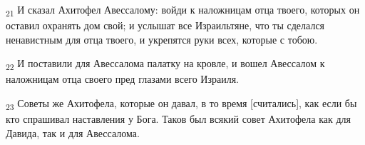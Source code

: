 \begin{tcolorbox}
\textsubscript{21} И сказал Ахитофел Авессалому: войди к наложницам отца твоего, которых он оставил охранять дом свой; и услышат все Израильтяне, что ты сделался ненавистным для отца твоего, и укрепятся руки всех, которые с тобою.
\end{tcolorbox}
\begin{tcolorbox}
\textsubscript{22} И поставили для Авессалома палатку на кровле, и вошел Авессалом к наложницам отца своего пред глазами всего Израиля.
\end{tcolorbox}
\begin{tcolorbox}
\textsubscript{23} Советы же Ахитофела, которые он давал, в то время [считались], как если бы кто спрашивал наставления у Бога. Таков был всякий совет Ахитофела как для Давида, так и для Авессалома.
\end{tcolorbox}
